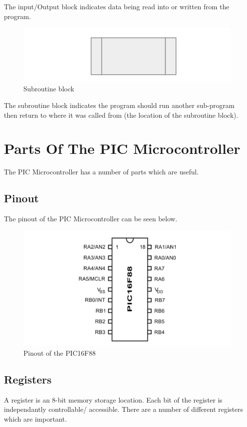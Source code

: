 \documentclass[a4paper,11pt, twocolumn]{article}
\begin{document}
\noindent The input/Output block indicates data being read into or written from the program.
\begin{figure}[H]
    \centering
    \includegraphics[width=\linewidth]{fcSubroutine.jpg}
    \caption{Subroutine block}
\end{figure}
\noindent The subroutine block indicates the program should run another sub-program then return to where it was called from (the location of the subroutine block).

\section{Parts Of The PIC Microcontroller}
The PIC Microcontroller has a number of parts which are useful.
\subsection{Pinout}
The pinout of the PIC Microcontroller can be seen below.
\begin{figure}[H]
    \centering
    \includegraphics[width=\linewidth]{pinout.jpg}
    \caption{Pinout of the PIC16F88}
\end{figure}
\subsection{Registers}
A register is an 8-bit memory storage location. Each bit of the register is independantly controllable/ accessible. There are a number of different registers which are important.
\end{document}
